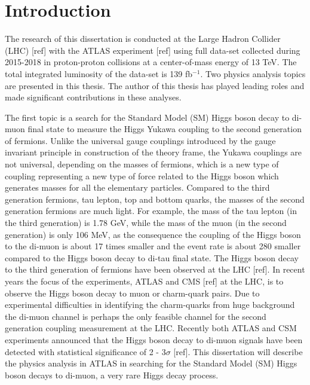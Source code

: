 \chapter{Introduction}

 The research of this dissertation is conducted at the Large Hadron Collider (LHC) [ref] with the ATLAS experiment [ref] using full data-set collected 
 during 2015-2018 in proton-proton collisions at a center-of-mass energy of 13 TeV.  The total integrated luminosity of the data-set is 139 fb$^{-1}$. 
 Two physics analysis topics are presented in this thesis. The author of this thesis has played leading roles and made significant contributions in these analyses.
 
 The first topic is a search for the Standard Model (SM) Higgs boson decay to di-muon final state to measure the Higgs Yukawa coupling to the second generation of fermions. 
 Unlike the universal gauge couplings introduced by the gauge invariant principle in construction of the theory frame, the Yukawa couplings are not universal, depending on the masses of fermions, which is a new type of coupling representing a new type of force related to the Higgs boson which generates masses for all the elementary particles. Compared to the third generation fermions, tau lepton, top and bottom quarks, the masses of the second generation fermions are much light. For example, the mass of the tau lepton (in the third generation) is 1.78 GeV, while the mass of the muon (in the second generation) is only 106 MeV, as the consequence the coupling of the Higgs boson to the di-muon is about 17 times smaller and the event rate is about 280 smaller compared to the Higgs boson decay to di-tau final state. The Higgs boson decay to the third generation of fermions have been observed at the LHC [ref]. In recent years the focus of the experiments, ATLAS and CMS [ref] at the LHC, is to observe the Higgs boson decay to muon or charm-quark pairs. Due to experimental difficulties in identifying the charm-quarks from huge background the di-muon channel is perhaps the only feasible channel for the second generation coupling measurement at the LHC. 
 Recently both ATLAS and CSM experiments announced that the Higgs boson decay to di-muon signals have been detected with statistical significance of 2 - 3$\sigma$ [ref]. This dissertation will describe the physics analysis in ATLAS in searching for the Standard Model (SM) Higgs boson decays to di-muon, a very rare Higgs decay process.
 
